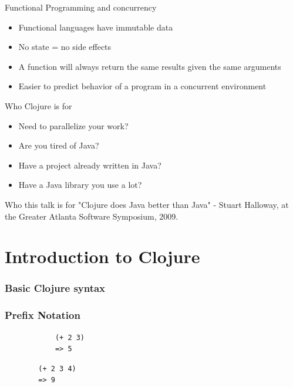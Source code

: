 \documentclass[xcolor=dvipsnames]{beamer}
\begin{document}
	\begin{frame}{Functional Programming and concurrency}
		\begin{itemize}
		\item Functional languages have immutable data
		\item No state = no side effects
		\item A function will always return the same results given the same arguments
		\item Easier to predict behavior of a program in a concurrent environment
		\end{itemize}
	\end{frame}
	
	\begin{frame}{Who Clojure is for}
			\begin{itemize}
				\item Need to parallelize your work?
				\item Are you tired of Java?
		\pause
				\item Have a project already written in Java?
				\item Have a Java library you use a lot?
			\end{itemize}
	\end{frame}
	
	\begin{frame}{Who this talk is for}
	"Clojure does Java better than Java" - Stuart Halloway, at the Greater Atlanta Software Symposium, 2009.
	\end{frame}
		
	\begin{frame}
		\tableofcontents
	\end{frame}
	
	\section{Introduction to Clojure}
		\subsubsection{Basic Clojure syntax}
		\begin{frame}[fragile]
		\frametitle{Prefix Notation}
		\begin{verbatim}
			(+ 2 3)
			=> 5
		\end{verbatim}
		\pause
		\begin{verbatim}
		(+ 2 3 4)
		=> 9
		\end{verbatim}
		\end{frame}
		
\end{document}
